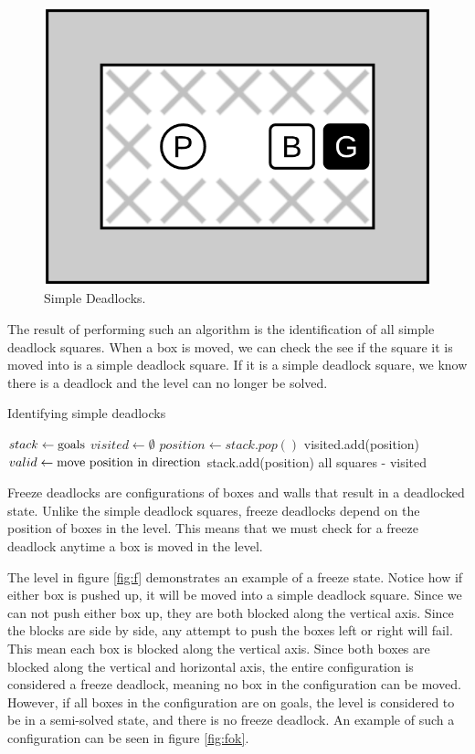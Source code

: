 \documentclass[times, 10pt,twocolumn]{article}
\begin{document}
\begin{figure}[h] 
  \centering
     \includegraphics[width=0.5\linewidth]{images/simple_deadlock.png}
  \caption{Simple Deadlocks.}
  \label{fig:sd}
\end{figure}

The result of performing such an algorithm is the identification of all simple deadlock squares. When a box is moved, we can check the see if the square it is moved into is a simple deadlock square. If it is a simple deadlock square, we know there is a deadlock and the level can no longer be solved.

\begin{algorithm}
  \caption{Identifying simple deadlocks}
\begin{algorithmic}[1]
    \State $stack\gets \textnormal{goals}$
    \State $visited\gets \emptyset$
      \State $position\gets stack.pop()$
      \State visited.add(position)
          \State $valid\gets \textnormal{move position in direction}$
          \State stack.add(position)
        \EndIf
      \EndFor
    \EndWhile
    \State \Return all squares - visited
  \EndFunction
  \end{algorithmic}
\end{algorithm}


Freeze deadlocks are configurations of boxes and walls that result in a deadlocked state. Unlike the simple deadlock squares, freeze deadlocks depend on the position of boxes in the level. This means that we must check for a freeze deadlock anytime a box is moved in the level. 

The level in figure \ref{fig:f} demonstrates an example of a freeze state. Notice how if either box is pushed up, it will be moved into a simple deadlock square. Since we can not push either box up, they are both blocked along the vertical axis. Since the blocks are side by side, any attempt to push the boxes left or right will fail. This mean each box is blocked along the vertical axis. Since both boxes are blocked along the vertical and horizontal axis, the entire configuration is considered a freeze deadlock, meaning no box in the configuration can be moved. However, if all boxes in the configuration are on goals, the level is considered to be in a semi-solved state, and there is no freeze deadlock. An example of such a configuration can be seen in figure \ref{fig:fok}.
\end{document}
